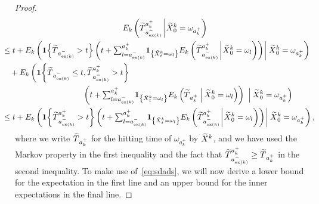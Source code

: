 \documentclass[AHL,Unicode,longabstracts,published]{cedram}
\newcommand{\bfun}{\mathbf{1}}
\newcommand{\Ek}{{E_k}}
\newcommand\ex{\operatorname{ex}}
\newcommand{\aat}[1]{a_{\ex(#1)}^-}
\let\oldtilde\tilde
\renewcommand*{\tilde}[1]{\mathchoice{\widetilde{#1}}{\widetilde{#1}}{\oldtilde{#1}}{\oldtilde{#1}}}
\begin{document}
\begin{proof}
\begin{multline}\label{eq:sdads}
 \Ek\left(\tilde{T}_{\aat{k}}^{a_k^+}\:\vline\:\tilde{X}^k_0=\omega_{a_k^+}\right)\\
\mkern-30mu{
\begin{aligned}
&\leq t+\Ek\left(\bfun{\left\{\tilde{T}_{\aat{k}}>t\right\}}\left(t+ {\textstyle \sum_{l=\aat{k}}^{a_k^+}}\bfun_{\left\{\tilde{X}^k_t=\omega_l\right\}}\Ek\left(\tilde{T}_{\aat{k}}^{a_k^+}\:\vline\:\tilde{X}^k_0=\omega_l\right)\right)\:\vline\:\tilde{X}^k_0=\omega_{a_k^+}\right)\\
&\quad +\Ek\left(\bfun{\left\{\tilde{T}_{\aat{k}}\leq t,\tilde{T}_{\aat{k}}^{a_k^+}>t\right\}}\right.\\
&\mkern180mu\left.\left(t+ {\textstyle \sum_{l=\aat{k}}^{a_k^+}}\bfun_{\left\{\tilde{X}^k_t=\omega_l\right\}}\Ek\left(\tilde{T}_{a_k^+}\:\middle|\:\tilde{X}^k_0=\omega_l\right)\right)\right.\:\Big|\:\tilde{X}^k_0=\omega_{a_k^+}\Big)\\
&\leq t+\Ek\left(\bfun{\left\{\tilde{T}_{\aat{k}}^{a_k^+}>t\right\}}\left(t+ {\textstyle \sum_{l=\aat{k}}^{a_k^+}}\bfun_{\left\{\tilde{X}^k_t=\omega_l\right\}}\Ek\left(\tilde{T}_{\aat{k}}^{a_k^+}\:\vline\:\tilde{X}^k_0=\omega_l\right)\right)\:\vline\:\tilde{X}^k_0=\omega_{a_k^+}\right),
\end{aligned}}
\end{multline}
where we write $\tilde{T}_{{a_k^+}}$ for the hitting time of $\omega_{a_k^+}$ by $\tilde{X}^k$, and we have used the Markov property in the first inequality and the fact that $\tilde{T}_{\aat{k}}^{a_k^+}\geq \tilde{T}_{a_k^+}$ in the second inequality. To make use of~\eqref{eq:sdads}, we will now derive a lower bound for the expectation in the first line and an upper bound for the inner expectations in the final line.


\end{proof}
\end{document}
